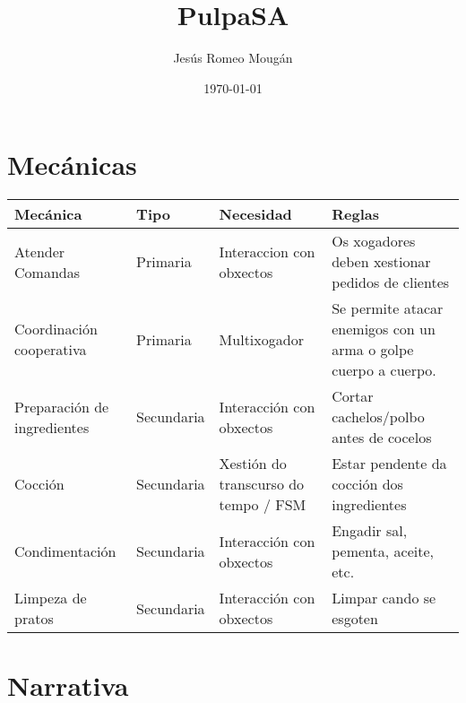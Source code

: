 \documentclass{report}  %
\title{PulpaSA}  %
\author{Jesús Romeo Mougán}                     %
\date{\today}                           %
\begin{document}
\captionsetup{aboveskip=5pt, belowskip=10pt}



\renewcommand{\contentsname}{Índice}

\tableofcontents


\newpage

\section{Mecánicas}

\begin{table}[h]
    \centering
    \renewcommand{\arraystretch}{1.3} %
    \setlength{\tabcolsep}{10pt} %
    \label{tab:mecanicas}
    \begin{tabular}{|p{4cm}|p{2cm}|p{3cm}|p{4cm}|}
        \hline
        \rowcolor{octopus} %
        \textbf{Mecánica}  & \textbf{Tipo} & \textbf{Necesidad} & \textbf{Reglas} \\
        \hline
        Atender Comandas & Primaria  & Interaccion con obxectos  & Os xogadores deben xestionar pedidos de clientes \\
        \hline
        Coordinación cooperativa & Primaria  & Multixogador    & Se permite atacar enemigos con un arma o golpe cuerpo a cuerpo. \\
        \hline
        Preparación de ingredientes  & Secundaria & Interacción con obxectos & Cortar cachelos/polbo antes de cocelos \\
        \hline
        Cocción & Secundaria & Xestión do transcurso do tempo / FSM & Estar pendente da cocción dos ingredientes \\
        \hline
        Condimentación & Secundaria & Interacción con obxectos & Engadir sal, pementa, aceite, etc. \\
        \hline
        Limpeza de pratos & Secundaria & Interacción con obxectos & Limpar cando se esgoten \\
        \hline

    \end{tabular}
\end{table}


\section{Narrativa}
\end{document}
